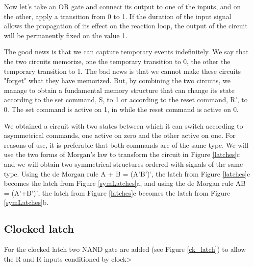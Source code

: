 Now let's take an OR gate and connect its output to one of the inputs, and on the other, apply a transition from 0 to 1. If the duration of the input signal allows the propagation of its effect on the reaction loop, the output of the circuit will be permanently fixed on the value 1.

The good news is that we can capture temporary events indefinitely. We say that the two circuits memorize, one the temporary transition to 0, the other the temporary transition to 1. The bad news is that we cannot make these circuits "forget" what they have memorized. But, by combining the two circuits, we manage to obtain a fundamental memory structure that can change its state according to the set command, S, to 1 or according to the reset command, R', to 0. The set command is active on 1, in while the reset command is active on 0.


We obtained a circuit with two states between which it can switch according to asymmetrical commands, one active on zero and the other active on one. For reasons of use, it is preferable that both commands are of the same type. We will use the two forms of Morgan's law to transform the circuit in Figure \ref{latches}c and we will obtain two symmetrical structures ordered with signals of the same type. Using the de Morgan rule  A + B = (A'B')', the latch from Figure \ref{latches}c becomes the latch from Figure \ref{symLatches}a, and using the de Morgan rule AB = (A'+B')', the latch from Figure \ref{latches}c becomes the latch from Figure \ref{symLatches}b.


\subsection{Clocked latch}

For the clocked latch two NAND gate are added (see Figure \ref{ck_latch}) to allow the R and R inputs conditioned by clock>


